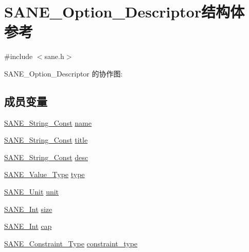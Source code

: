 \hypertarget{structSANE__Option__Descriptor}{}\section{S\+A\+N\+E\+\_\+\+Option\+\_\+\+Descriptor结构体 参考}
\label{structSANE__Option__Descriptor}


{\ttfamily \#include $<$sane.\+h$>$}



S\+A\+N\+E\+\_\+\+Option\+\_\+\+Descriptor 的协作图\+:
\subsection*{成员变量}
\begin{DoxyCompactItemize}
\item 
\hyperlink{sane_8h_a9a47323dab2a36db080f1bcc11585af4}{S\+A\+N\+E\+\_\+\+String\+\_\+\+Const} \hyperlink{structSANE__Option__Descriptor_ac4155621a2154ad3160c415fef6ca643}{name}
\item 
\hyperlink{sane_8h_a9a47323dab2a36db080f1bcc11585af4}{S\+A\+N\+E\+\_\+\+String\+\_\+\+Const} \hyperlink{structSANE__Option__Descriptor_a069392f9b5739153679dcccfd2bb50fe}{title}
\item 
\hyperlink{sane_8h_a9a47323dab2a36db080f1bcc11585af4}{S\+A\+N\+E\+\_\+\+String\+\_\+\+Const} \hyperlink{structSANE__Option__Descriptor_a668582efe29f5a4c9aab395afcd6ea18}{desc}
\item 
\hyperlink{sane_8h_aed3324dea8f24f5381e12e5562aaf72b}{S\+A\+N\+E\+\_\+\+Value\+\_\+\+Type} \hyperlink{structSANE__Option__Descriptor_a0f7c7e0902094d466389a82671b5b150}{type}
\item 
\hyperlink{sane_8h_a15e903425f365e0fe30fed1e37446990}{S\+A\+N\+E\+\_\+\+Unit} \hyperlink{structSANE__Option__Descriptor_a25b4534fcc925c6f316a3f180ec34435}{unit}
\item 
\hyperlink{sane_8h_a18b0de32eae6997909ae9ab0117af3d5}{S\+A\+N\+E\+\_\+\+Int} \hyperlink{structSANE__Option__Descriptor_a9b1f811d7c85d008d8a60e0b8d3e4a25}{size}
\item 
\hyperlink{sane_8h_a18b0de32eae6997909ae9ab0117af3d5}{S\+A\+N\+E\+\_\+\+Int} \hyperlink{structSANE__Option__Descriptor_a884b023bc72593766267a98ee0333607}{cap}
\item 
\hyperlink{sane_8h_a6422f68f593477ab1fd81078e9afc8e9}{S\+A\+N\+E\+\_\+\+Constraint\+\_\+\+Type} \hyperlink{structSANE__Option__Descriptor_a10767a0944d00b3dad2de45086512e76}{constraint\+\_\+type}

\end{DoxyCompactItemize}
